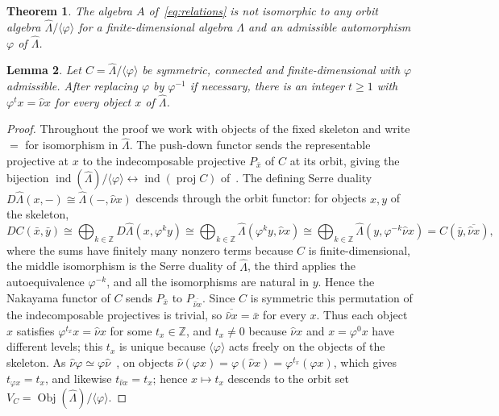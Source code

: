 \documentclass[11pt]{amsart}
\theoremstyle{plain}
\newtheorem{theorem}{Theorem}
\newtheorem{lemma}[theorem]{Lemma}
\theoremstyle{definition}
\DeclareMathOperator{\ind}{ind}
\DeclareMathOperator{\proj}{proj}
\DeclareMathOperator{\Obj}{Obj}
\newcommand{\rep}{\widehat{\Lambda}}
\newcommand{\Nak}{\widehat{\nu}}
\newcommand{\ZZ}{\mathbb{Z}}
\begin{document}
\begin{theorem}\label{thm:nonorbit}
The algebra $A$ of~\eqref{eq:relations} is not isomorphic to any orbit algebra $\rep/\langle\varphi\rangle$
for a finite-dimensional algebra $\Lambda$ and an admissible automorphism $\varphi$ of $\rep$.
\end{theorem}

\begin{lemma}\label{lem:shift}
Let $C=\rep/\langle\varphi\rangle$ be symmetric, connected and finite-dimensional with $\varphi$ admissible.
After replacing $\varphi$ by $\varphi^{-1}$ if necessary, there is an integer $t\ge 1$ with $\varphi^t x=\Nak
x$ for every object $x$ of $\rep$.
\end{lemma}

\begin{proof}
Throughout the proof we work with objects of the fixed skeleton and write $=$ for isomorphism in $\rep$. The
push-down functor sends the representable projective at $x$ to the indecomposable projective $P_{\bar x}$ of
$C$ at its orbit, giving the bijection $\ind(\rep)/\langle\varphi\rangle\leftrightarrow\ind(\proj C)$
of~\cite[\S3]{DI}. The defining Serre duality $D\rep(x,-)\cong\rep(-,\Nak x)$ descends through the orbit
functor: for objects $x,y$ of the skeleton,
\[
 DC(\bar x,\bar y)\cong\bigoplus_{k\in\ZZ}D\rep(x,\varphi^ky)
 \cong\bigoplus_{k\in\ZZ}\rep(\varphi^ky,\Nak x)
 \cong\bigoplus_{k\in\ZZ}\rep(y,\varphi^{-k}\Nak x)=C(\bar y,\overline{\Nak x}),
\]
where the sums have finitely many nonzero terms because $C$ is finite-dimensional, the middle isomorphism is
the Serre duality of $\rep$, the third applies the autoequivalence $\varphi^{-k}$, and all the isomorphisms
are natural in $y$. Hence the Nakayama functor of $C$ sends $P_{\bar x}$ to $P_{\overline{\Nak x}}$. Since $C$
is symmetric this permutation of the indecomposable projectives is trivial, so $\overline{\Nak x}=\bar x$ for
every $x$. Thus each object $x$ satisfies $\varphi^{t_x}x=\Nak x$ for some $t_x\in\ZZ$, and $t_x\neq 0$
because $\Nak x$ and $x=\varphi^0x$ have different levels; this $t_x$ is unique because
$\langle\varphi\rangle$ acts freely on the objects of the skeleton. As
$\Nak\varphi\simeq\varphi\Nak$~\cite[(2.6)]{DI}, on objects $\Nak(\varphi x)=\varphi(\Nak
x)=\varphi^{t_x}(\varphi x)$, which gives $t_{\varphi x}=t_x$, and likewise $t_{\Nak x}=t_x$; hence $x\mapsto
t_x$ descends to the orbit set $V_C=\Obj(\rep)/\langle\varphi\rangle$.


\end{proof}
\end{document}
